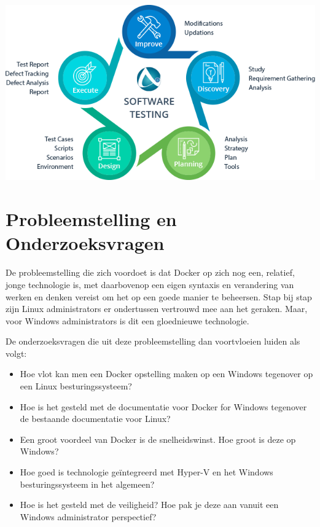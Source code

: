 \begin{center}
	\includegraphics[scale=0.5]{img/testingprocess.png}
\end{center}

\section{Probleemstelling en Onderzoeksvragen}
\label{sec:onderzoeksvragen}


De probleemstelling die zich voordoet is dat Docker op zich nog een, relatief, jonge technologie is, met daarbovenop een eigen syntaxis en verandering van werken en denken vereist om het op een goede manier te beheersen. Stap bij stap zijn Linux administrators er ondertussen vertrouwd mee aan het geraken. Maar, voor Windows administrators is dit een gloednieuwe technologie.


De onderzoeksvragen die uit deze probleemstelling dan voortvloeien luiden als volgt:
\begin{itemize}[noitemsep]
	\item Hoe vlot kan men een Docker opstelling maken op een Windows tegenover op een Linux besturingssysteem?
	\item Hoe is het gesteld met de documentatie voor Docker for Windows tegenover de bestaande documentatie voor Linux?
	\item Een groot voordeel van Docker is de snelheidswinst. Hoe groot is deze op Windows?
	\item Hoe goed is technologie geïntegreerd met Hyper-V en het Windows besturingssysteem in het algemeen?
	\item Hoe is het gesteld met de veiligheid? Hoe pak je deze aan vanuit een Windows administrator perspectief?
\end{itemize}



